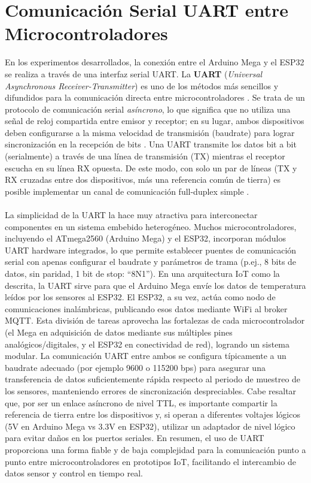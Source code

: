 \section{Comunicación Serial UART entre Microcontroladores}
En los experimentos desarrollados, la conexión entre el Arduino Mega y el ESP32 se realiza a través de una interfaz serial UART. La \textbf{UART} (\textit{Universal Asynchronous Receiver-Transmitter}) es uno de los métodos más sencillos y difundidos para la comunicación directa entre microcontroladores
\cite{Analog-UART}. Se trata de un protocolo de comunicación serial \textit{asíncrono}, lo que significa que no utiliza una señal de reloj compartida entre emisor y receptor; en su lugar, ambos dispositivos deben configurarse a la misma velocidad de transmisión (baudrate) para lograr sincronización en la recepción de bits
\cite{Analog-UART}. Una UART transmite los datos bit a bit (serialmente) a través de una línea de transmisión (TX) mientras el receptor escucha en su línea RX opuesta. De este modo, con solo un par de líneas (TX y RX cruzadas entre dos dispositivos, más una referencia común de tierra) es posible implementar un canal de comunicación full-duplex simple
\cite{Analog-UART}.
\\\\
La simplicidad de la UART la hace muy atractiva para interconectar componentes en un sistema embebido heterogéneo. Muchos microcontroladores, incluyendo el ATmega2560 (Arduino Mega) y el ESP32, incorporan módulos UART hardware integrados, lo que permite establecer puentes de comunicación serial con apenas configurar el baudrate y parámetros de trama (p.ej., 8 bits de datos, sin paridad, 1 bit de stop: “8N1”). En una arquitectura IoT como la descrita, la UART sirve para que el Arduino Mega envíe los datos de temperatura leídos por los sensores al ESP32. El ESP32, a su vez, actúa como nodo de comunicaciones inalámbricas, publicando esos datos mediante WiFi al broker MQTT. Esta división de tareas aprovecha las fortalezas de cada microcontrolador (el Mega en adquisición de datos mediante sus múltiples pines analógicos/digitales, y el ESP32 en conectividad de red), logrando un sistema modular. La comunicación UART entre ambos se configura típicamente a un baudrate adecuado (por ejemplo 9600 o 115200 bps) para asegurar una transferencia de datos suficientemente rápida respecto al periodo de muestreo de los sensores, manteniendo errores de sincronización despreciables. Cabe resaltar que, por ser un enlace asíncrono de nivel TTL, es importante compartir la referencia de tierra entre los dispositivos y, si operan a diferentes voltajes lógicos (5V en Arduino Mega vs 3.3V en ESP32), utilizar un adaptador de nivel lógico para evitar daños en los puertos seriales. En resumen, el uso de UART proporciona una forma fiable y de baja complejidad para la comunicación punto a punto entre microcontroladores en prototipos IoT, facilitando el intercambio de datos sensor y control en tiempo real.